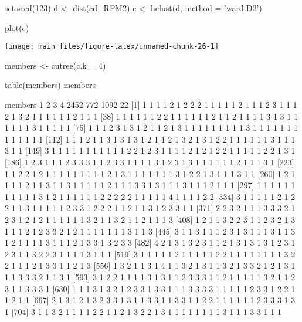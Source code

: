 \begin{Schunk}
\begin{Sinput}
set.seed(123)
d <- dist(cd_RFM2)
c <- hclust(d, method = 'ward.D2')

plot(c)
\end{Sinput}


\begin{center}\texttt{[image: main\_files/figure-latex/unnamed-chunk-26-1]} \end{center}

\end{Schunk}

\begin{Schunk}
\begin{Sinput}
members <- cutree(c,k = 4)

table(members)
members
\end{Sinput}
\begin{Soutput}
members
   1    2    3    4 
2452  772 1092   22 
   [1] 1 1 1 1 2 1 2 2 2 1 1 1 1 1 2 1 1 1 2 3 1 1 1 2 1 3 2 1 1 1 1 1 1 2 1 1 1
  [38] 1 1 1 1 1 1 2 2 1 1 1 1 1 1 2 1 1 2 1 1 1 1 3 1 3 1 1 1 1 1 1 3 1 1 1 1 1
  [75] 1 1 1 2 3 1 3 1 2 1 1 2 1 3 1 1 1 1 1 1 1 1 1 3 1 1 1 1 1 1 1 1 1 1 1 1 1
 [112] 1 1 1 2 1 1 3 1 3 1 3 1 2 1 1 2 1 3 2 1 3 1 2 2 1 1 1 1 1 1 3 1 1 1 3 1 1
 [149] 3 1 1 1 1 1 1 1 1 1 1 1 2 2 1 2 3 1 1 1 1 2 1 2 1 2 2 1 1 1 1 1 2 2 1 3 1
 [186] 1 2 3 1 1 1 2 3 3 3 1 1 2 3 3 1 1 1 1 3 1 2 3 1 3 1 1 1 1 1 1 2 1 1 1 3 1
 [223] 1 1 2 2 1 2 1 1 1 1 1 1 1 1 1 2 1 3 1 1 1 1 1 1 1 3 1 2 2 1 3 1 1 1 3 1 1
 [260] 1 2 1 1 1 1 2 1 1 3 1 1 3 1 1 1 1 1 2 1 1 1 3 3 1 3 1 1 1 3 1 1 1 2 1 1 1
 [297] 1 1 1 1 1 1 1 1 1 1 1 3 1 2 1 1 1 1 1 1 2 2 2 2 2 1 1 1 1 1 4 1 1 1 1 2 2
 [334] 3 1 1 1 1 1 2 1 2 2 1 1 3 1 1 1 1 1 2 3 3 1 2 2 2 1 1 2 1 1 3 1 2 3 3 1 1
 [371] 2 2 3 2 1 1 1 3 3 3 2 1 2 3 1 2 1 2 1 1 1 1 1 1 3 2 1 1 3 2 1 1 2 1 1 1 3
 [408] 1 2 1 1 3 2 2 3 1 1 2 3 2 1 3 1 1 1 2 1 2 3 3 2 1 2 1 1 1 1 1 1 1 3 1 1 3
 [445] 3 1 1 3 1 1 1 2 3 1 3 1 1 1 3 1 1 3 1 2 1 1 1 1 3 1 1 1 2 1 3 3 1 3 2 3 3
 [482] 4 2 1 3 1 3 2 3 1 1 2 1 3 1 3 1 3 1 2 3 1 2 3 1 1 3 2 2 3 1 1 1 1 3 1 1 1
 [519] 3 1 1 1 1 1 2 1 1 1 1 1 2 2 1 1 1 1 1 1 1 1 3 2 2 1 1 1 2 1 3 3 1 1 2 1 3
 [556] 1 3 2 1 1 3 1 4 1 1 3 2 1 3 1 1 3 2 1 3 3 2 1 2 1 3 1 1 1 3 3 3 2 1 1 3 1
 [593] 3 1 2 2 1 1 1 1 3 1 3 1 1 2 3 3 3 1 1 2 1 1 1 1 1 3 2 1 1 2 3 1 1 3 3 3 1
 [630] 1 1 1 3 1 3 2 1 2 3 3 1 3 3 1 1 1 3 3 3 3 1 1 1 1 1 2 3 3 1 2 2 1 1 2 1 1
 [667] 2 1 3 1 2 1 3 2 3 3 1 3 1 1 3 3 1 1 3 3 1 1 2 2 1 1 1 1 1 1 2 3 3 3 1 3 1
 [704] 3 1 1 3 2 1 1 1 1 2 2 1 1 2 1 3 2 2 1 3 1 1 1 1 1 1 1 1 3 1 1 1 3 3 1 1 1

\end{Soutput}
\end{Schunk}
